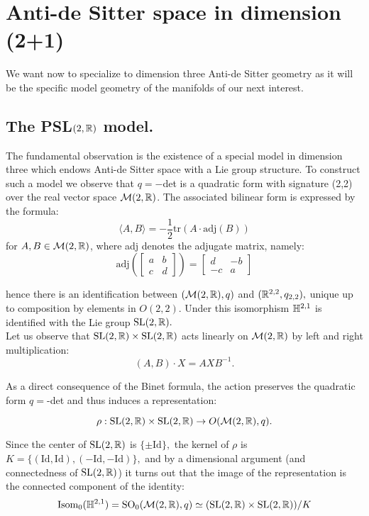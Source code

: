 \chapter{Anti-de Sitter space in dimension (2+1)}
We want now to specialize to dimension three Anti-de Sitter geometry as it will be the specific model geometry of the manifolds of our next interest. 
\section{The {PSL}$(2,\mathbb{R})$ model.} 

The fundamental observation is the existence of a special model in dimension three which endows Anti-de Sitter space with a Lie group structure. To construct such a model we observe that $q=-$det is a quadratic form with signature (2,2) over the real vector space $\mathcal{M}(2,\mathbb{R})$. The associated bilinear form is expressed by the formula:
\begin{equation}\label{quadratic}
    \langle A,B\rangle=-\frac{1}{2}\text{tr}(A\cdot\text{adj}(B))
\end{equation}
for $A,B\in\mathcal{M}(2,\mathbb{R})$, where adj denotes the adjugate matrix, namely: 
\[
    \text{adj}(\begin{bmatrix}
        a & b \\
        c & d
    \end{bmatrix}) = \begin{bmatrix}
        d & -b \\
        -c & a
    \end{bmatrix}
\]

hence there is an identification between $(\mathcal{M}(2,\mathbb{R}),q)$ and $(\mathbb{R}^{2,2}, q_{2,2}),$ unique up to composition by elements in $O(2,2)$. Under this isomorphism $\mathbb{H}^{2,1}$ is identified with the Lie group $\text{SL}(2,\mathbb{R}).$\\
Let us observe that $\text{SL}(2,\mathbb{R})\times \text{SL}(2,\mathbb{R})$ acts linearly on $\mathcal{M}(2,\mathbb{R})$ by left and right multiplication:
$$(A,B)\cdot X=AXB^{-1}.$$

As a direct consequence of the Binet formula, the action preserves the quadratic form $q=$-det and thus induces a representation: 

\[ \rho:\text{SL}(2,\mathbb{R})\times \text{SL}(2,\mathbb{R})\to O(\mathcal{M}(2,\mathbb{R}),q). \]

Since the center of $\text{SL}(2,\mathbb{R})$ is $\{\pm \text{Id}\},$ the kernel of $\rho$ is $K=\{(\text{Id},\text{Id}),(-\text{Id},-\text{Id})\},$ and by a dimensional argument (and connectedness of $\text{SL}(2,\mathbb{R})$) it turns out that the image of the representation is the connected component of the identity: 
\[
    \text{Isom}_0(\mathbb{H}^{2,1})=\text{SO}_0(\mathcal{M}(2,\mathbb{R}),q)\simeq (\text{SL}(2,\mathbb{R})\times \text{SL}(2,\mathbb{R}))/K
\]
    
